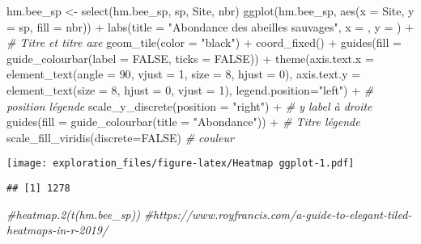 \documentclass[
]{article}
\newenvironment{Shaded}{\begin{snugshade}}{\end{snugshade}}
\newcommand{\AttributeTok}[1]{\textcolor[rgb]{0.77,0.63,0.00}{#1}}
\newcommand{\CommentTok}[1]{\textcolor[rgb]{0.56,0.35,0.01}{\textit{#1}}}
\newcommand{\ConstantTok}[1]{\textcolor[rgb]{0.00,0.00,0.00}{#1}}
\newcommand{\DecValTok}[1]{\textcolor[rgb]{0.00,0.00,0.81}{#1}}
\newcommand{\FunctionTok}[1]{\textcolor[rgb]{0.00,0.00,0.00}{#1}}
\newcommand{\NormalTok}[1]{#1}
\newcommand{\OtherTok}[1]{\textcolor[rgb]{0.56,0.35,0.01}{#1}}
\newcommand{\SpecialCharTok}[1]{\textcolor[rgb]{0.00,0.00,0.00}{#1}}
\newcommand{\StringTok}[1]{\textcolor[rgb]{0.31,0.60,0.02}{#1}}
\begin{document}
\begin{Shaded}
\begin{Highlighting}[]
\NormalTok{hm.bee\_sp }\OtherTok{\textless{}{-}} \FunctionTok{select}\NormalTok{(hm.bee\_sp, sp, Site, nbr)}
\FunctionTok{ggplot}\NormalTok{(hm.bee\_sp, }\FunctionTok{aes}\NormalTok{(}\AttributeTok{x =}\NormalTok{ Site, }\AttributeTok{y =}\NormalTok{ sp, }\AttributeTok{fill =}\NormalTok{ nbr)) }\SpecialCharTok{+}
  \FunctionTok{labs}\NormalTok{(}\AttributeTok{title =} \StringTok{"Abondance des abeilles sauvages"}\NormalTok{, }\AttributeTok{x =} \StringTok{\textquotesingle{}\textquotesingle{}}\NormalTok{, }\AttributeTok{y =} \StringTok{\textquotesingle{}\textquotesingle{}}\NormalTok{) }\SpecialCharTok{+} \CommentTok{\# Titre et titre axe}
  \FunctionTok{geom\_tile}\NormalTok{(}\AttributeTok{color =} \StringTok{"black"}\NormalTok{) }\SpecialCharTok{+}
  \FunctionTok{coord\_fixed}\NormalTok{() }\SpecialCharTok{+}
  \FunctionTok{guides}\NormalTok{(}\AttributeTok{fill =} \FunctionTok{guide\_colourbar}\NormalTok{(}\AttributeTok{label =} \ConstantTok{FALSE}\NormalTok{,}
                                \AttributeTok{ticks =} \ConstantTok{FALSE}\NormalTok{)) }\SpecialCharTok{+}
  \FunctionTok{theme}\NormalTok{(}\AttributeTok{axis.text.x =} \FunctionTok{element\_text}\NormalTok{(}\AttributeTok{angle =} \DecValTok{90}\NormalTok{, }\AttributeTok{vjust =} \DecValTok{1}\NormalTok{, }\AttributeTok{size =} \DecValTok{8}\NormalTok{, }\AttributeTok{hjust =} \DecValTok{0}\NormalTok{),}
        \AttributeTok{axis.text.y =} \FunctionTok{element\_text}\NormalTok{(}\AttributeTok{size =} \DecValTok{8}\NormalTok{, }\AttributeTok{hjust =} \DecValTok{0}\NormalTok{, }\AttributeTok{vjust =} \DecValTok{1}\NormalTok{),}
        \AttributeTok{legend.position=}\StringTok{"left"}\NormalTok{) }\SpecialCharTok{+} \CommentTok{\# position légende}
  \FunctionTok{scale\_y\_discrete}\NormalTok{(}\AttributeTok{position =} \StringTok{"right"}\NormalTok{) }\SpecialCharTok{+} \CommentTok{\# y label à droite}
  \FunctionTok{guides}\NormalTok{(}\AttributeTok{fill =} \FunctionTok{guide\_colourbar}\NormalTok{(}\AttributeTok{title =} \StringTok{"Abondance"}\NormalTok{)) }\SpecialCharTok{+} \CommentTok{\# Titre légende}
  \FunctionTok{scale\_fill\_viridis}\NormalTok{(}\AttributeTok{discrete=}\ConstantTok{FALSE}\NormalTok{)  }\CommentTok{\# couleur}
\end{Highlighting}
\end{Shaded}

\texttt{[image: exploration\_files/figure-latex/Heatmap ggplot-1.pdf]}

\begin{Shaded}
\end{Shaded}

\begin{verbatim}
## [1] 1278
\end{verbatim}

\begin{Shaded}
\begin{Highlighting}[]
\CommentTok{\#heatmap.2(t(hm.bee\_sp))}
\CommentTok{\#https://www.royfrancis.com/a{-}guide{-}to{-}elegant{-}tiled{-}heatmaps{-}in{-}r{-}2019/}
\end{Highlighting}
\end{Shaded}
\end{document}
